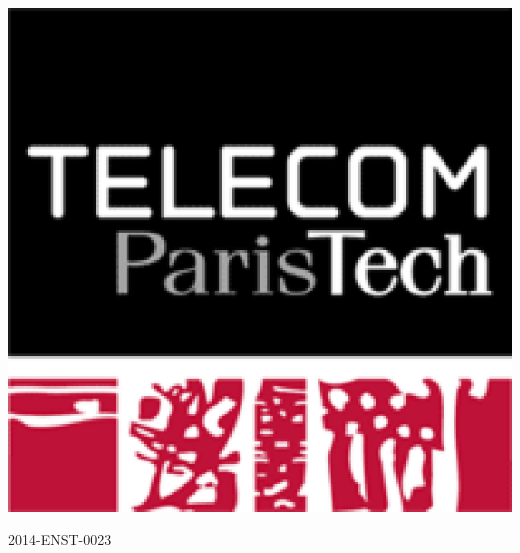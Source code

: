




%
\AddToShipoutPicture*{\BackgroundPic}
~


\begin{flushright}

\includegraphics[scale=0.45]{logo_TPT.eps}

{\small {2014-ENST-0023}}
\end{flushright}




